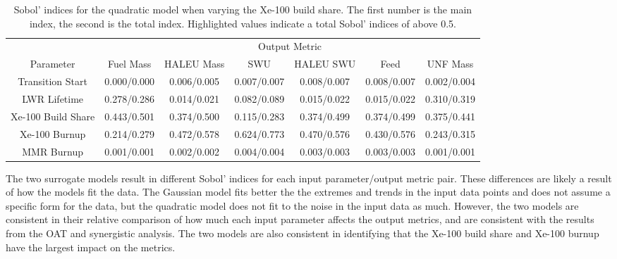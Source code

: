 \begin{table}[h!]
    \centering
    \caption{Sobol' indices for the quadratic model when varying the Xe-100 
    build share. The first number is the main index, the second is the total 
    index. Highlighted 
    values indicate a total Sobol' indices of above 0.5.}
    \label{tab:s7_sobol_xe100_quadratic}
    \begin{tabular}{c c c c c c c}
        \hline
        & \multicolumn{6}{c}{Output Metric} \\
        Parameter & Fuel Mass & HALEU Mass & SWU & HALEU SWU & Feed & UNF Mass \\
        \hline
        Transition Start & 0.000/0.000& 0.006/0.005 & 0.007/0.007 &
                           0.008/0.007 & 0.008/0.007 & 0.002/0.004\\
        LWR Lifetime & 0.278/0.286 & 0.014/0.021 & 0.082/0.089 & 
                       0.015/0.022 & 0.015/0.022 & 0.310/0.319\\
        Xe-100 Build Share & \cellcolor{green!25}0.443/0.501 & \cellcolor{green!25}0.374/0.500 & 0.115/0.283 & 
                             0.374/0.499 & 0.374/0.499 & 0.375/0.441\\
        Xe-100 Burnup & 0.214/0.279 & \cellcolor{green!25}0.472/0.578 & \cellcolor{green!25}0.624/0.773 &
                        \cellcolor{green!25}0.470/0.576 & \cellcolor{green!25}0.430/0.576 & 0.243/0.315\\
        MMR Burnup & 0.001/0.001 & 0.002/0.002 & 0.004/0.004 &
                     0.003/0.003 & 0.003/0.003 & 0.001/0.001\\
        \hline        
    \end{tabular}
\end{table}

The two surrogate models result in different Sobol' indices for each 
input parameter/output metric pair. These differences are likely a result 
of how the models fit the data. The Gaussian model fits 
better the the extremes and trends in the input data points and does not 
assume a specific form for the data, but the 
quadratic model does not fit to the noise in the input data as much. 
However, the two models are consistent in 
their relative comparison of how much each input parameter affects the output 
metrics, and are consistent with the results from the \gls{OAT} and 
synergistic analysis. The two models are also consistent in 
identifying that the Xe-100 build share and Xe-100 burnup 
have the largest impact on the metrics.

